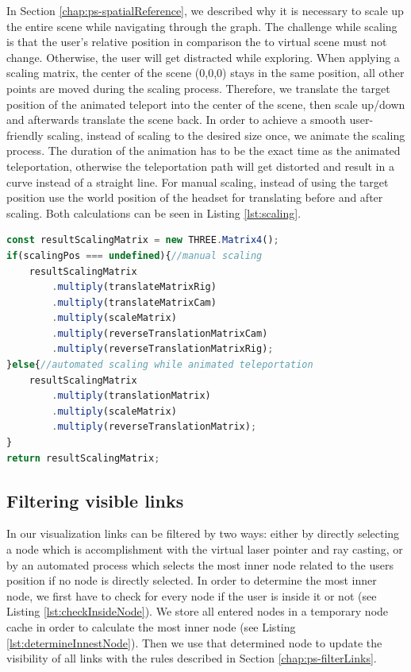 In Section \ref{chap:ps-spatialReference}, we described why it is necessary to scale up the entire scene while navigating through the graph. 
The challenge while scaling is that the user's relative position in comparison the to virtual scene must not change. Otherwise, the user will get distracted while exploring.
When applying a scaling matrix, the center of the scene (0,0,0) stays in the same position, all other points are moved during the scaling process. 
Therefore, we translate the target position of the animated teleport into the center of the scene, then scale up/down and afterwards translate the scene back.
In order to achieve a smooth user-friendly scaling, instead of scaling to the desired size once, we animate the scaling process. The duration of the animation has to be the exact time as the animated teleportation, otherwise the teleportation path will get distorted and result in a curve instead of a straight line.
For manual scaling, instead of using the target position use the world position of the headset for translating before and after scaling. Both calculations can be seen in Listing \ref{lst:scaling}.

\begin{lstlisting}[language=JavaScript,label={lst:scaling},caption=Simplified algorithm for calculating the scaling matrix]
const resultScalingMatrix = new THREE.Matrix4();
if(scalingPos === undefined){//manual scaling
    resultScalingMatrix
        .multiply(translateMatrixRig)
        .multiply(translateMatrixCam)
        .multiply(scaleMatrix)
        .multiply(reverseTranslationMatrixCam)
        .multiply(reverseTranslationMatrixRig);
}else{//automated scaling while animated teleportation
    resultScalingMatrix
        .multiply(translationMatrix)
        .multiply(scaleMatrix)
        .multiply(reverseTranslationMatrix);
}
return resultScalingMatrix;
\end{lstlisting}

\subsection{Filtering visible links}
\label{sec:linkFiltering}

In our visualization links can be filtered by two ways: either by directly selecting a node which is accomplishment with the virtual laser pointer and ray casting, or by an automated process which selects the most inner node related to the users position if no node is directly selected.
In order to determine the most inner node, we first have to check for every node if the user is inside it or not (see Listing \ref{lst:checkInsideNode}). We store all entered nodes in a temporary node cache in order to calculate the most inner node (see Listing \ref{lst:determineInnestNode}).
Then we use that determined node to update the visibility of all links with the rules described in Section \ref{chap:ps-filterLinks}.

